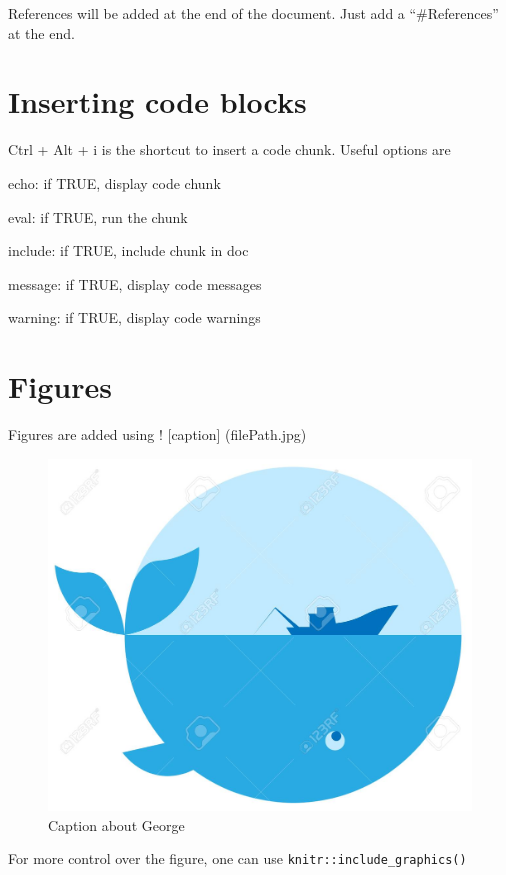\documentclass[
  11pt,
]{article}
\begin{document}
References will be added at the end of the document. Just add a ``\#References'' at the end.

\hypertarget{inserting-code-blocks}{%
\section{Inserting code blocks}\label{inserting-code-blocks}}

Ctrl + Alt + i is the shortcut to insert a code chunk. Useful options are

echo: if TRUE, display code chunk

eval: if TRUE, run the chunk

include: if TRUE, include chunk in doc

message: if TRUE, display code messages

warning: if TRUE, display code warnings

\hypertarget{figures}{%
\section{Figures}\label{figures}}

Figures are added using ! {[}caption{]} (filePath.jpg)

\begin{figure}
\centering
\includegraphics{George.jpg}
\caption{Caption about George}
\end{figure}

For more control over the figure, one can use \texttt{knitr::include\_graphics()}
\end{document}
